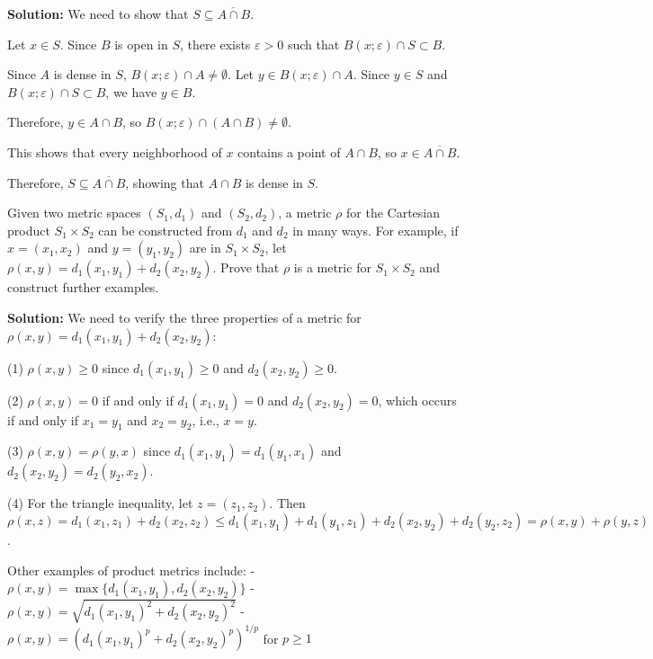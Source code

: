 \textbf{Solution:} We need to show that $S \subseteq \overline{A \cap B}$.

Let $x \in S$. Since $B$ is open in $S$, there exists $\varepsilon > 0$ such that $B(x;\varepsilon) \cap S \subset B$.

Since $A$ is dense in $S$, $B(x;\varepsilon) \cap A \neq \emptyset$. Let $y \in B(x;\varepsilon) \cap A$. Since $y \in S$ and $B(x;\varepsilon) \cap S \subset B$, we have $y \in B$.

Therefore, $y \in A \cap B$, so $B(x;\varepsilon) \cap (A \cap B) \neq \emptyset$.

This shows that every neighborhood of $x$ contains a point of $A \cap B$, so $x \in \overline{A \cap B}$.

Therefore, $S \subseteq \overline{A \cap B}$, showing that $A \cap B$ is dense in $S$.

\begin{problembox}
Given two metric spaces \((S_1, d_1)\) and \((S_2, d_2)\), a metric \( \rho \) for the Cartesian product \( S_1 \times S_2 \) can be constructed from \( d_1 \) and \( d_2 \) in many ways. For example, if \( x = (x_1, x_2) \) and \( y = (y_1, y_2) \) are in \( S_1 \times S_2 \), let \( \rho(x, y) = d_1(x_1, y_1) + d_2(x_2, y_2) \). Prove that \( \rho \) is a metric for \( S_1 \times S_2 \) and construct further examples.
\end{problembox}

\textbf{Solution:} We need to verify the three properties of a metric for $\rho(x,y) = d_1(x_1,y_1) + d_2(x_2,y_2)$:

(1) $\rho(x,y) \geq 0$ since $d_1(x_1,y_1) \geq 0$ and $d_2(x_2,y_2) \geq 0$.

(2) $\rho(x,y) = 0$ if and only if $d_1(x_1,y_1) = 0$ and $d_2(x_2,y_2) = 0$, which occurs if and only if $x_1 = y_1$ and $x_2 = y_2$, i.e., $x = y$.

(3) $\rho(x,y) = \rho(y,x)$ since $d_1(x_1,y_1) = d_1(y_1,x_1)$ and $d_2(x_2,y_2) = d_2(y_2,x_2)$.

(4) For the triangle inequality, let $z = (z_1,z_2)$. Then $\rho(x,z) = d_1(x_1,z_1) + d_2(x_2,z_2) \leq d_1(x_1,y_1) + d_1(y_1,z_1) + d_2(x_2,y_2) + d_2(y_2,z_2) = \rho(x,y) + \rho(y,z)$.

Other examples of product metrics include:
- $\rho(x,y) = \max\{d_1(x_1,y_1), d_2(x_2,y_2)\}$
- $\rho(x,y) = \sqrt{d_1(x_1,y_1)^2 + d_2(x_2,y_2)^2}$
- $\rho(x,y) = (d_1(x_1,y_1)^p + d_2(x_2,y_2)^p)^{1/p}$ for $p \geq 1$

